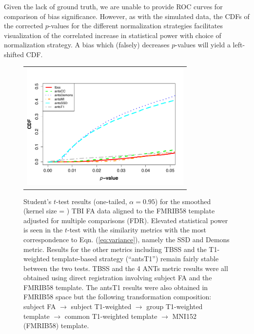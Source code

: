 \documentclass[final,5p,times,twocolumn]{elsarticle}
\begin{document}
Given the lack 
of ground truth, we are unable to provide ROC curves for comparison
of bias significance. However, as with the simulated data, the CDFs of the 
corrected $p$-values 
for the different normalization
strategies facilitates visualization of the correlated increase in statistical
power with choice of normalization strategy.
A bias which (falsely) decreases $p$-values will yield a left-shifted
CDF.  


 


\begin{figure}
\begin{center}
\begin{tabular}{c}
  \includegraphics[width=85mm]{tbittest.pdf}
\end{tabular}
\caption{Student's $t$-test results (one-tailed, $\alpha = 0.95$) for the smoothed (kernel size = )
TBI FA data aligned to the FMRIB58 template adjusted for multiple comparisons (FDR).  Elevated statistical power is seen in the $t$-test with the similarity metrics with the most correspondence to Eqn. (\ref{eq:variance}), namely the SSD and Demons metric.  Results for the other metrics including TBSS and the T1-weighted template-based strategy (``antsT1'') remain fairly stable between the two tests.    TBSS and the 4 ANTs metric
results were all obtained using direct registration involving subject FA and the FMRIB58 template.  The antsT1 results were also obtained in FMRIB58 space but the following transformation composition: subject FA $\rightarrow$ subject T1-weighted $\rightarrow$ group T1-weighted template $\rightarrow$ 
common T1-weighted template $\rightarrow$ MNI152 (FMRIB58) template.  
}
\label{fig:tbi_testing}
\end{center}        
\end{figure}
\end{document}
